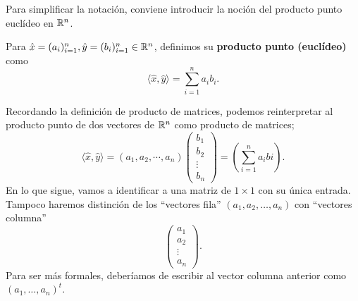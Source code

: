 Para simplificar la notación, conviene introducir la noción del
producto 
punto euclídeo en $\mathbb{R}^{n}$.
\begin{defi}
Para $\hat{x} = (a_{i})_{i=1}^{n}, 
\hat{y} = (b_{i})_{i=1}^{n} \in \mathbb{R}^{n}$, definimos su \textbf{producto
punto (euclídeo)} como
\[
\langle \hat{x}, \hat{y} \rangle = 
\sum_{i=1}^{n} a_{i} b_{i}.
\]
\end{defi}
Recordando la definición de producto de matrices, podemos
reinterpretar al producto punto de dos vectores de $\mathbb{R}^{n}$
como producto de matrices;
\[
\langle \hat{x}, \hat{y} \rangle =
(a_{1}, a_{2}, \cdots , a_{n}) 
\begin{pmatrix}
b_{1} \\ b_{2} \\ \vdots \\ b_{n}
\end{pmatrix} 
= \left( \sum_{i=1}^{n}a_{i}b{i} \right).
\]
En lo que sigue, vamos a identificar
a una matriz de $1 \times 1$ con su única entrada.
Tampoco haremos distinción de los
``vectores fila''
$(a_{1}, a_{2}, \ldots , a_{n})$ con 
``vectores columna'' 
\[
\begin{pmatrix}
a_{1} \\ a_{2} \\ \vdots \\ a_{n}
\end{pmatrix}.
\]
Para ser más formales, deberíamos de escribir al 
vector columna anterior como $(a_{1}, \ldots , a_{n})^{t}$.

